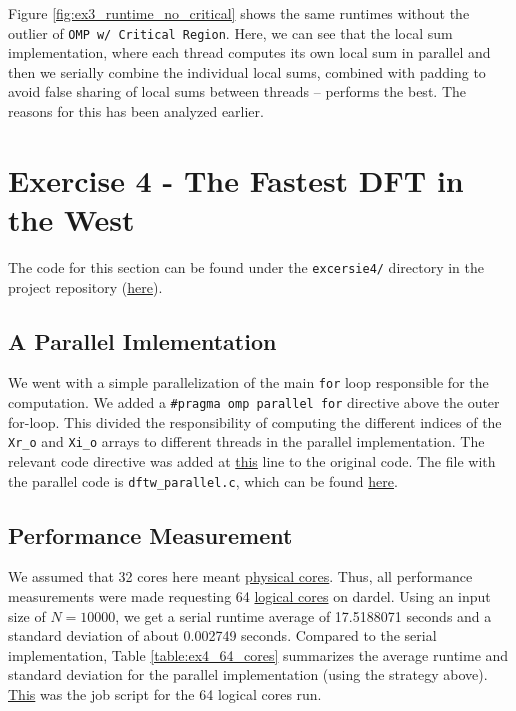 \documentclass[a4paper,10pt]{article}
\begin{document}
Figure \ref{fig:ex3_runtime_no_critical} shows the same runtimes without the outlier of \verb|OMP w/ Critical Region|. Here, we can see that the local sum implementation, where each thread computes its own local sum in parallel and then we serially combine the individual local sums, combined with padding to avoid false sharing of local sums between threads -- performs the best. The reasons for this has been analyzed earlier. 

\section{Exercise 4 - The Fastest DFT in the West}
The code for this section can be found under the \verb|excersie4/| directory in the project repository (\href{https://github.com/paulmyr/DD2356-MethodsHPC/tree/master/3_open_mp/exercise4}{here}). 

\subsection{A Parallel Imlementation}
We went with a simple parallelization of the main \verb|for| loop responsible for the computation. We added a \verb|#pragma omp parallel for| directive above the outer for-loop. This divided the responsibility of computing the different indices of the \verb|Xr_o| and \verb|Xi_o| arrays to different threads in the parallel implementation. The relevant code directive was added at \href{https://github.com/paulmyr/DD2356-MethodsHPC/blob/master/3_open_mp/exercise4/dftw_parallel.c#L88}{this} line to the original code. The file with the parallel code is \verb|dftw_parallel.c|, which can be found \href{https://github.com/paulmyr/DD2356-MethodsHPC/blob/master/3_open_mp/exercise4/dftw_parallel.c}{here}.


\subsection{Performance Measurement}
We assumed that 32 cores here meant \underline{physical cores}. Thus, all performance measurements were made requesting 64 \underline{logical cores} on dardel. Using an input size of $N = 10000$, we get a serial runtime average of 17.5188071 seconds and a standard deviation of about 0.002749 seconds. Compared to the serial implementation, Table \ref{table:ex4_64_cores} summarizes the average runtime and standard deviation for the parallel implementation (using the strategy above). \href{https://github.com/paulmyr/DD2356-MethodsHPC/blob/master/3_open_mp/exercise4/job_scripts/dftw_parallel_job.sh}{This} was the job script for the 64 logical cores run.
\end{document}
